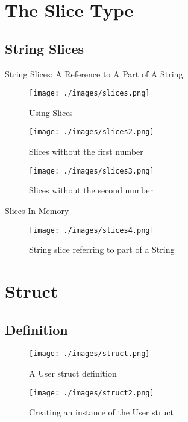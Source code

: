 \documentclass[10pt]{beamer}
\begin{document}
\section{The Slice Type}
\subsection{String Slices}
\begin{frame}{String Slices: A Reference to A Part of A String}
    \begin{figure}[htpb]
        \centering
        \texttt{[image: ./images/slices.png]}
        \vspace*{-2mm}
        \caption{Using Slices\cite{rust-book}}
    \end{figure}

    \vspace*{-5mm}
    \begin{figure}[htpb]
        \centering
        \texttt{[image: ./images/slices2.png]}
        \vspace*{-2mm}
        \caption{Slices without the first number\cite{rust-book}}
    \end{figure}

    \vspace*{-5mm}
    \begin{figure}[htpb]
        \centering
        \texttt{[image: ./images/slices3.png]}
        \vspace*{-2mm}
        \caption{Slices without the second number\cite{rust-book}}
    \end{figure}
\end{frame}

\begin{frame}{Slices In Memory}
    \begin{figure}[htpb]
        \centering
        \texttt{[image: ./images/slices4.png]}
        \vspace*{-2mm}
        \caption{String slice referring to part of a String\cite{rust-book}}
    \end{figure}
\end{frame}

\section{Struct}
\subsection{Definition}
\begin{frame}
    \begin{figure}[htpb]
        \centering
        \texttt{[image: ./images/struct.png]}
        \caption{A User struct definition\cite{rust-book}}
    \end{figure}

    \begin{figure}[htpb]
        \centering
        \texttt{[image: ./images/struct2.png]}
        \caption{Creating an instance of the User struct\cite{rust-book}}
    \end{figure}
\end{frame}
\end{document}
